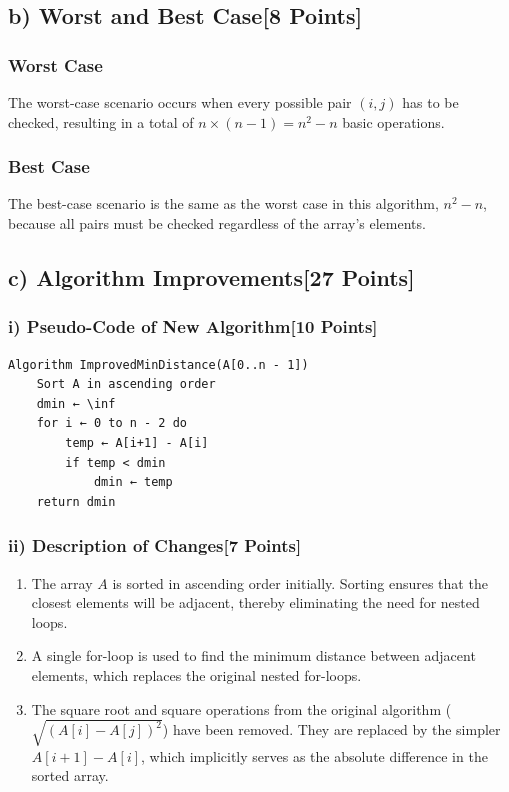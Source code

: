 \documentclass[12pt]{article}
\begin{document}
\subsection*{b) Worst and Best Case[8 Points]}
\subsubsection*{Worst Case}
The worst-case scenario occurs when every possible pair \((i, j)\) has to be checked, resulting in a total of \(n \times (n-1) = n^2 - n\) basic operations.
\subsubsection*{Best Case}
The best-case scenario is the same as the worst case in this algorithm, \(n^2 - n\), because all pairs must be checked regardless of the array's elements.

\subsection*{c) Algorithm Improvements[27 Points]}

\subsubsection*{i) Pseudo-Code of New Algorithm[10 Points]}
\begin{verbatim}
Algorithm ImprovedMinDistance(A[0..n - 1])
    Sort A in ascending order
    dmin ← \inf
    for i ← 0 to n - 2 do
        temp ← A[i+1] - A[i]
        if temp < dmin
            dmin ← temp
    return dmin
\end{verbatim}

\subsubsection*{ii) Description of Changes[7 Points]}
\begin{enumerate}
    \item The array \(A\) is sorted in ascending order initially. Sorting ensures that the closest elements will be adjacent, thereby eliminating the need for nested loops.
    \item A single for-loop is used to find the minimum distance between adjacent elements, which replaces the original nested for-loops.
    \item The square root and square operations from the original algorithm (\( \sqrt{(A[i]-A[j])^2} \)) have been removed. They are replaced by the simpler \( A[i+1] - A[i] \), which implicitly serves as the absolute difference in the sorted array.
\end{enumerate}
\end{document}
